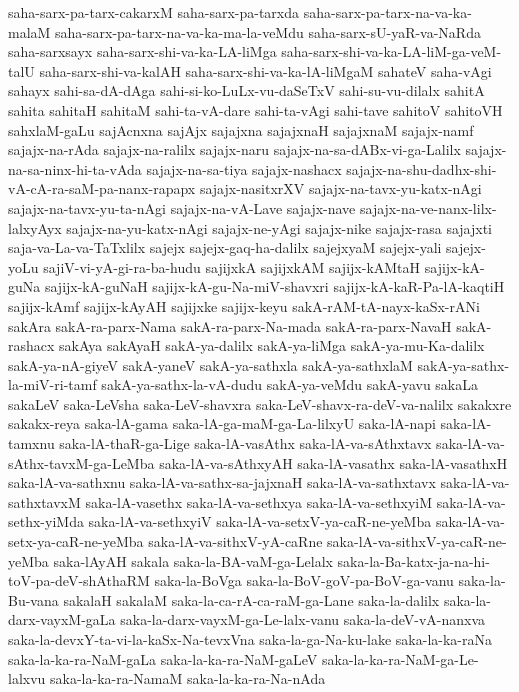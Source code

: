 {saha-sarx-pa-tarx-cakarxM
saha-sarx-pa-tarxda
saha-sarx-pa-tarx-na-va-ka-malaM
saha-sarx-pa-tarx-na-va-ka-ma-la-veMdu
saha-sarx-sU-yaR-va-NaRda
saha-sarxsayx
saha-sarx-shi-va-ka-LA-liMga
saha-sarx-shi-va-ka-LA-liM-ga-veM-talU
saha-sarx-shi-va-kalAH
saha-sarx-shi-va-ka-lA-liMgaM
sahateV
saha-vAgi
sahayx
sahi-sa-dA-dAga
sahi-si-ko-LuLx-vu-daSeTxV
sahi-su-vu-dilalx
sahitA
sahita
sahitaH
sahitaM
sahi-ta-vA-dare
sahi-ta-vAgi
sahi-tave
sahitoV
sahitoVH
sahxlaM-gaLu
sajAcnxna
sajAjx
sajajxna
sajajxnaH
sajajxnaM
sajajx-namf
sajajx-na-rAda
sajajx-na-ralilx
sajajx-naru
sajajx-na-sa-dABx-vi-ga-Lalilx
sajajx-na-sa-ninx-hi-ta-vAda
sajajx-na-sa-tiya
sajajx-nashacx
sajajx-na-shu-dadhx-shi-vA-cA-ra-saM-pa-nanx-rapapx
sajajx-nasitxrXV
sajajx-na-tavx-yu-katx-nAgi
sajajx-na-tavx-yu-ta-nAgi
sajajx-na-vA-Lave
sajajx-nave
sajajx-na-ve-nanx-lilx-lalxyAyx
sajajx-na-yu-katx-nAgi
sajajx-ne-yAgi
sajajx-nike
sajajx-rasa
sajajxti
saja-va-La-va-TaTxlilx
sajejx
sajejx-gaq-ha-dalilx
sajejxyaM
sajejx-yali
sajejx-yoLu
sajiV-vi-yA-gi-ra-ba-hudu
sajijxkA
sajijxkAM
sajijx-kAMtaH
sajijx-kA-guNa
sajijx-kA-guNaH
sajijx-kA-gu-Na-miV-shavxri
sajijx-kA-kaR-Pa-lA-kaqtiH
sajijx-kAmf
sajijx-kAyAH
sajijxke
sajijx-keyu
sakA-rAM-tA-nayx-kaSx-rANi
sakAra
sakA-ra-parx-Nama
sakA-ra-parx-Na-mada
sakA-ra-parx-NavaH
sakA-rashacx
sakAya
sakAyaH
sakA-ya-dalilx
sakA-ya-liMga
sakA-ya-mu-Ka-dalilx
sakA-ya-nA-giyeV
sakA-yaneV
sakA-ya-sathxla
sakA-ya-sathxlaM
sakA-ya-sathx-la-miV-ri-tamf
sakA-ya-sathx-la-vA-dudu
sakA-ya-veMdu
sakA-yavu
sakaLa
sakaLeV
saka-LeVsha
saka-LeV-shavxra
saka-LeV-shavx-ra-deV-va-nalilx
sakakxre
sakakx-reya
saka-lA-gama
saka-lA-ga-maM-ga-La-lilxyU
saka-lA-napi
saka-lA-tamxnu
saka-lA-thaR-ga-Lige
saka-lA-vasAthx
saka-lA-va-sAthxtavx
saka-lA-va-sAthx-tavxM-ga-LeMba
saka-lA-va-sAthxyAH
saka-lA-vasathx
saka-lA-vasathxH
saka-lA-va-sathxnu
saka-lA-va-sathx-sa-jajxnaH
saka-lA-va-sathxtavx
saka-lA-va-sathxtavxM
saka-lA-vasethx
saka-lA-va-sethxya
saka-lA-va-sethxyiM
saka-lA-va-sethx-yiMda
saka-lA-va-sethxyiV
saka-lA-va-setxV-ya-caR-ne-yeMba
saka-lA-va-setx-ya-caR-ne-yeMba
saka-lA-va-sithxV-yA-caRne
saka-lA-va-sithxV-ya-caR-ne-yeMba
saka-lAyAH
sakala
saka-la-BA-vaM-ga-Lelalx
saka-la-Ba-katx-ja-na-hi-toV-pa-deV-shAthaRM
saka-la-BoVga
saka-la-BoV-goV-pa-BoV-ga-vanu
saka-la-Bu-vana
sakalaH
sakalaM
saka-la-ca-rA-ca-raM-ga-Lane
saka-la-dalilx
saka-la-darx-vayxM-gaLa
saka-la-darx-vayxM-ga-Le-lalx-vanu
saka-la-deV-vA-nanxva
saka-la-devxY-ta-vi-la-kaSx-Na-tevxVna
saka-la-ga-Na-ku-lake
saka-la-ka-raNa
saka-la-ka-ra-NaM-gaLa
saka-la-ka-ra-NaM-gaLeV
saka-la-ka-ra-NaM-ga-Le-lalxvu
saka-la-ka-ra-NamaM
saka-la-ka-ra-Na-nAda
}
